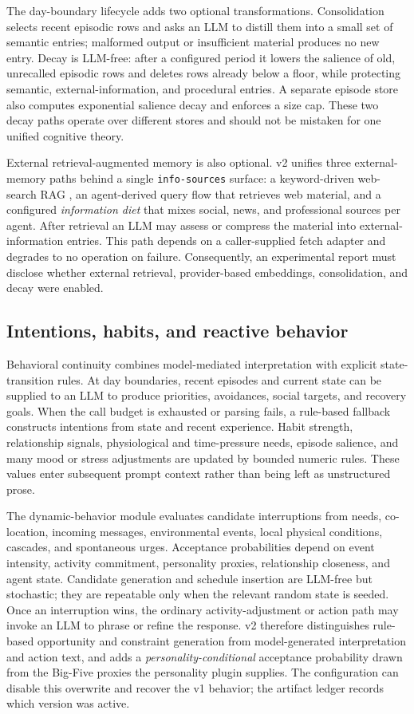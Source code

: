The day-boundary lifecycle adds two optional transformations.  Consolidation
selects recent episodic rows and asks an LLM to distill them into a small set
of semantic entries; malformed output or insufficient material produces no
new entry.  Decay is LLM-free: after a configured period it lowers the
salience of old, unrecalled episodic rows and deletes rows already below a
floor, while protecting semantic, external-information, and procedural
entries.  A separate episode store also computes exponential salience decay
and enforces a size cap.  These two decay paths operate over different stores
and should not be mistaken for one unified cognitive theory.

External retrieval-augmented memory is also optional.  v2 unifies three
external-memory paths behind a single \texttt{info-sources} surface: a
keyword-driven web-search RAG \citep{gaworldrag}, an agent-derived query
flow that retrieves web material, and a configured \emph{information diet}
that mixes social, news, and professional sources per agent.  After retrieval
an LLM may assess or compress the material into external-information
entries.  This path depends on a caller-supplied fetch adapter and degrades
to no operation on failure.  Consequently, an experimental report must
disclose whether external retrieval, provider-based embeddings,
consolidation, and decay were enabled.

\subsection{Intentions, habits, and reactive behavior}

Behavioral continuity combines model-mediated interpretation with explicit
state-transition rules.  At day boundaries, recent episodes and current state
can be supplied to an LLM to produce priorities, avoidances, social targets,
and recovery goals.  When the call budget is exhausted or parsing fails, a
rule-based fallback constructs intentions from state and recent experience.
Habit strength, relationship signals, physiological and time-pressure needs,
episode salience, and many mood or stress adjustments are updated by bounded
numeric rules.  These values enter subsequent prompt context rather than
being left as unstructured prose.

The dynamic-behavior module evaluates candidate interruptions from needs,
co-location, incoming messages, environmental events, local physical
conditions, cascades, and spontaneous urges.  Acceptance probabilities
depend on event intensity, activity commitment, personality proxies,
relationship closeness, and agent state.  Candidate generation and schedule
insertion are LLM-free but stochastic; they are repeatable only when the
relevant random state is seeded.  Once an interruption wins, the ordinary
activity-adjustment or action path may invoke an LLM to phrase or refine the
response.  v2 therefore distinguishes rule-based opportunity and constraint
generation from model-generated interpretation and action text, and adds a
\emph{personality-conditional} acceptance probability drawn from the Big-Five
proxies the personality plugin supplies.  The configuration can disable this
overwrite and recover the v1 behavior; the artifact ledger records which
version was active.

